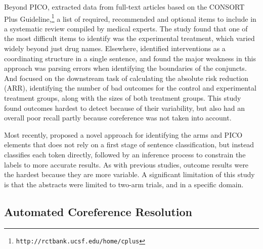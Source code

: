Beyond PICO,  extracted data from full-text articles based on the CONSORT Plus Guideline,\footnote{\tt http://rctbank.ucsf.edu/home/cplus} a list of required, recommended and optional items to include in a systematic review compiled by medical experts. The study found that one of the most difficult items to identify was the experimental treatment, which varied widely beyond just drug names. Elsewhere,  identified interventions as a coordinating structure in a single sentence, and found the major weakness in this approach was parsing errors when identifying the boundaries of the conjuncts. And  focused on the downstream task of calculating the absolute risk reduction (ARR), identifying the number of bad outcomes for the control and experimental treatment groups, along with the sizes of both treatment groups. This study found outcomes hardest to detect because of their variability, but also had an overall poor recall partly because coreference was not taken into account.



Most recently,  proposed a novel approach for identifying the arms and PICO elements that does not rely on a first stage of sentence classification, but instead classifies each token directly, followed by an inference process to constrain the labels to more accurate results. As with previous studies, outcome results were the hardest because they are more variable. A significant limitation of this study is that the abstracts were limited to two-arm trials, and in a specific domain.

\subsection{Automated Coreference Resolution}
\label{subsec:coref}

